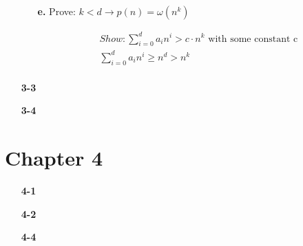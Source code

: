 \documentclass{article}
\begin{document}
\begin{enumerate}
\begin{enumerate}
	\item[\textbf{e.}] Prove: $ k < d \rightarrow p(n) = \omega(n^k) $

	\begin{align*}
		& Show: \sum_{i=0}^d a_i n^i > c \cdot n^k \text{    with some constant c} \\
		& \sum_{i=0}^d a_i n^i \geq n^d > n^k \\
	\end{align*}

\end{enumerate}

\item[\textbf{3-3}]

\item[\textbf{3-4}]

\end{enumerate}

\section*{Chapter 4}
\begin{enumerate}

\item[\textbf{4-1}]

\item[\textbf{4-2}]

\item[\textbf{4-4}]

\end{enumerate}
\end{document}
